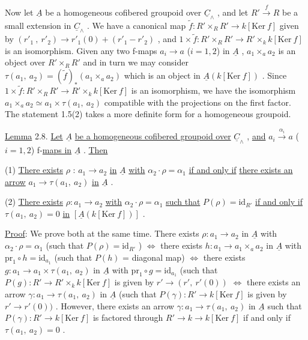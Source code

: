 Now let  $\underline{A}$  be a homogeneous cofibered groupoid over  $\underline{C}_{\wedge}$  , and let  $R' \xrightarrow{\ f\ } R$  be a small extension in  $\underline{C}_{\wedge}$  . We have a canonical map
$\tilde{f} : R' \times_{R} R' \longrightarrow k[\mathrm{Ker}\ f]$  given by  $(r'_{1}\ ,\ r'_{2}) \longrightarrow r'_{1}(0) + (r'_{1} - r'_{2})$  , and  $1 \times \tilde{f} : R' \times_{R} R' \longrightarrow R' \times_{k} k[\mathrm{Ker}\ f]$  is an isomorphism. Given any two f-maps  $a_{i} \to a$  ($i=1,2$) in  $\underline{A}$  ,  $a_{1} \times_{a} a_{2}$  is an object over  $R' \times_{R} R'$  and in turn we may consider  $\tau(a_{1},\ a_{2}) = (\tilde{f})_{*}(a_{1} \times_{a} a_{2})$  which is an object in  $\underline{A}(k[\mathrm{Ker}\ f])$  . Since  $1 \times \tilde{f} : R' \times_{R} R' \longrightarrow R' \times_{k} k[\mathrm{Ker}\ f]$  is an isomorphism, we have the isomorphism  $a_{1} \times_{a} a_{2} \simeq a_{1} \times \tau(a_{1},\ a_{2})$  compatible with the projections on the first factor. The statement 1.5(2) takes a more definite form for a homogeneous groupoid.

\underline{Lemma} 2.8.  \underline{Let}  $\underline{A}$  \underline{be a homogeneous cofibered groupoid over}  $\underline{C}_{\wedge}$  , \underline{and}  $a_{i} \xrightarrow{\ \alpha_{i}\ } a$  ($i = 1, 2$)  f-\underline{maps in}  $\underline{A}$  . \underline{Then}

(1)  \underline{There exists}  $\rho$  : $a_{1} \to a_{2}$  \underline{in}  $\underline{A}$  \underline{with}  $\alpha_{2} \cdot \rho = \alpha_{1}$  \underline{if and only if} \underline{there exists an arrow}  $a_{1} \to \tau(a_{1},\ a_{2})$  \underline{in}  $\underline{A}$  .

(2)  \underline{There exists}  $\rho : a_{1} \to a_{2}$  \underline{with}  $\alpha_{2} \cdot \rho = \alpha_{1}$  \underline{such that}  $P(\rho) = \mathrm{id}_{R'}$ \underline{if and only if}  $\tau(a_{1},\ a_{2}) = 0$  \underline{in}  $[\underline{A}(k[\mathrm{Ker}\ f])]$  .

\underline{Proof}:  We prove both at the same time. There exists  $\rho : a_{1} \to a_{2}$  in  $\underline{A}$  with  $\alpha_{2} \cdot \rho = \alpha_{1}$  (such that  $P(\rho) = \mathrm{id}_{R'}$ )  $\Leftrightarrow$  there exists  $h : a_{1} \to a_{1} \times_{a} a_{2}$  in  $\underline{A}$  with  $\mathrm{pr}_{1} \circ h = \mathrm{id}_{a_{1}}$  (such that  $P(h)$ = diagonal map)  $\Leftrightarrow$ there exists  $g : a_{1} \to a_{1} \times \tau(a_{1},\ a_{2})$  in  $\underline{A}$  with  $\mathrm{pr}_{1} \circ g = \mathrm{id}_{a_{1}}$  (such that  $P(g) : R' \to R' \times_{k} k[\mathrm{Ker}\ f]$  is given by  $r' \to (r',\ r'(0))$  $\Leftrightarrow$ there exists an arrow  $\gamma : a_{1} \to \tau(a_{1},\ a_{2})$  in  $\underline{A}$  (such that  $P(\gamma) : R' \to k[\mathrm{Ker}\ f]$  is given by  $r' \to r'(0))$  . However, there exists an arrow  $\gamma : a_{1} \to \tau(a_{1},\ a_{2})$  in  $\underline{A}$  such that  $P(\gamma) : R' \to k[\mathrm{Ker}\ f]$  is factored through  $R' \to k \to k[\mathrm{Ker}\ f]$  if and only if  $\tau(a_{1},\ a_{2}) = 0$  .

